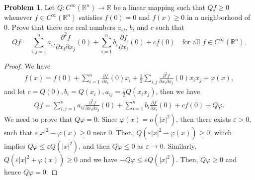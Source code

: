 \documentclass[11pt]{article}
\theoremstyle{definition}
\newtheorem{problem}{Problem}
\theoremstyle{definition}
\begin{document}
\medskip

\begin{problem}
Let $Q:C^\infty(\mathbb{R}^n)\to\mathbb{R}$ be a linear mapping such that $Qf\geq 0$ whenever $f\in C^\infty(\mathbb{R}^n)$ satisfies $f(0)=0$ and $f(x)\geq 0$ in a neighborhood of $0$. Prove that there are real numbers $a_{ij}$, $b_i$ and $c$ such that
$$
Qf=\sum_{i,j=1}^n a_{ij}\frac{\partial^2 f}{\partial x_i\partial x_j}(0)+\sum_{i=1}^n b_i\frac{\partial f}{\partial x_i}(0)+cf(0)
\quad
\text{for all $f\in C^\infty(\mathbb{R}^n)$.}
$$
\end{problem}
\begin{proof}
We have 
\begin{align*}
    f(x) = f(0) + \sum^n_{i=1} \frac{\partial f}{\partial x_i}(0) x_i + \frac{1}{2} \sum_{i,j} \frac{\partial^2 f}{\partial x_i \partial x_j}(0) x_i x_j + \varphi(x),
\end{align*}
and let $c = Q(0), b_i = Q(x_i), a_{ij} = \frac{1}{2}Q(x_i x_j)$, then we have 
\begin{align*}
    Qf = \sum_{i,j=1}^n a_{ij}\frac{\partial^2 f}{\partial x_i\partial x_j}(0) + \sum_{i=1}^n b_i\frac{\partial f}{\partial x_i}(0) + cf(0) + Q\varphi.
\end{align*}
We need to prove that $Q\varphi = 0$. Since $\varphi(x) = o(|x|^2)$, then there exists $\varepsilon > 0$, such that $\varepsilon |x|^2 - \varphi(x) \geq 0$ near $0$. Then, $Q \left(\varepsilon |x|^2 - \varphi(x) \right) \geq 0$, which implies $Q\varphi \leq \varepsilon Q\left(|x|^2\right)$, and then $Q\varphi \leq 0$ as $\varepsilon \to 0$. Similarly, $Q \left(\varepsilon |x|^2 + \varphi(x) \right) \geq 0$ and we have $-Q\varphi \leq \varepsilon Q \left(|x|^2\right)$. Then, $Q\varphi \geq 0$ and hence $Q\varphi = 0$.
\end{proof}

\medskip
\end{document}
